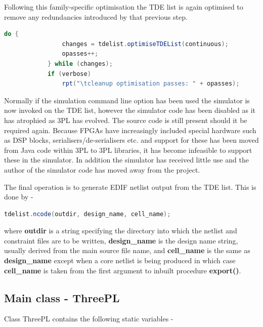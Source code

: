 \documentclass[10pt,a4paper,twoside,fleqn]{book}
\begin{document}
        Following this family-specific optimisation the TDE list is again
        optimised to remove any redundancies introduced by that previous step.

        \begin{lstlisting}[gobble=8, language=java]
            do {
                changes = tdelist.optimiseTDEList(continuous);
                opasses++;
            } while (changes);
            if (verbose)
                rpt("\tcleanup optimisation passes: " + opasses);
        \end{lstlisting}

        Normally if the simulation command line option has been used the simulator
        is now invoked on the TDE list, however the simulator code has been
        disabled as it has atrophied as 3PL has evolved. The source code is still
        present should it be required again. Because FPGAs have increasingly
        included special hardware such as DSP blocks, serialisers/de-serialisers
        etc. and support for these has been moved from Java code within 3PL to 3PL
        libraries, it has become infeasible to support these in the simulator. In
        addition the simulator has received little use and the author of the
        simulator code has moved away from the project.

        The final operation is to generate EDIF netlist output from the TDE
        list. This is done by -
        \begin{lstlisting}[gobble=8, language=java]
            tdelist.ncode(outdir, design_name, cell_name);
        \end{lstlisting}
        where {\bf outdir} is a string specifying the directory into which the
        netlist and constraint files are to be written, {\bf design\_name} is
        the design name string, usually derived from the main source file name,
        and {\bf cell\_name} is the same as {\bf design\_name} except when a
        core netlist is being produced in which case {\bf cell\_name} is taken
        from the first argument to inbuilt procedure {\bf export()}.

    

        \subsection{Main class - ThreePL}

            Class ThreePL contains the following static variables -


\end{document}
